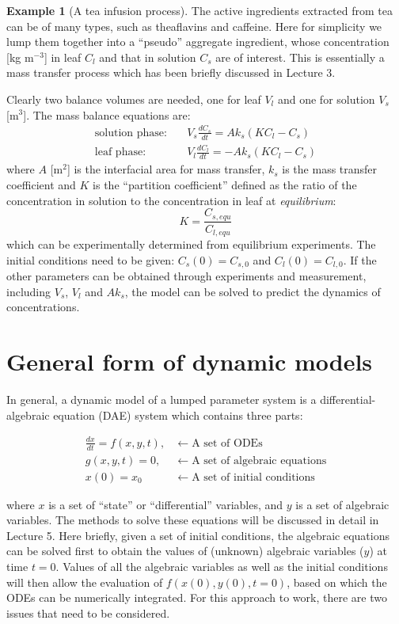 \documentclass[a4paper,11pt]{article}
\theoremstyle{definition}
\newtheorem{exmp}{Example}[section]
\begin{document}
\begin{exmp}[A tea infusion process]
The active ingredients extracted from tea can be of many types, such as theaflavins and caffeine.
Here for simplicity we lump them together into a ``pseudo'' aggregate ingredient, whose concentration [kg m$^{-3}$] in
leaf $C_l$ and that in solution $C_s$ are of interest. This is essentially a mass transfer process which has been
briefly discussed in Lecture 3.

Clearly two balance volumes are needed, one for leaf $V_l$ and one for solution $V_s$ [m$^3$].
The mass balance equations are:
\begin{align}
 	\textrm{solution phase:} \quad & V_s \frac{d C_s}{d t} = A k_s ( K C_l - C_s) \\
	\textrm{leaf phase:} \quad & V_l \frac{d C_l}{d t} = - A k_s ( K C_l - C_s)	
\end{align}
\noindent where $A$ [m$^2$] is the interfacial area for mass transfer, $k_s$ is the mass transfer
coefficient and $K$ is the ``partition coefficient'' defined as the ratio of the concentration in
solution to the concentration in leaf at \emph{equilibrium}:
\[
	K = \frac{ C_{s, equ} }{ C_{l, equ} }
\]
\noindent which can be experimentally determined from equilibrium experiments.
The initial conditions need to be given: $C_s(0) = C_{s,0}$ and $C_l(0) = C_{l,0}$.
If the other parameters can be obtained through experiments and measurement,
including $V_s$, $V_l$ and $A k_s$, the model can be solved to predict
the dynamics of concentrations.

\end{exmp}


\section{General form of dynamic models}

In general, a dynamic model of a lumped parameter system is a differential-algebraic equation (DAE)
system which contains three parts:

\begin{align}
	\frac{d x}{d t} = f(x, y, t),  \; &\leftarrow \; \textrm{A set of ODEs} \\
	g(x, y, t) = 0,                     \; &\leftarrow \; \textrm{A set of algebraic equations} \\
	x(0) = x_0                          \; &\leftarrow \; \textrm{A set of initial conditions}
\end{align}

\noindent where $x$ is a set of ``state'' or ``differential'' variables, and $y$ is a set of algebraic variables.
The methods to solve these equations will be discussed in detail in Lecture 5.
Here briefly, given a set of initial conditions, the algebraic equations can be solved first
to obtain the values of (unknown) algebraic variables ($y$) at time $t=0$. 
Values of all the algebraic variables as well as the initial conditions will then allow the evaluation of $f(x(0), y(0), t=0)$, based on which the ODEs can be numerically integrated.
For this approach to work, there are two issues that need to be considered.
\end{document}
